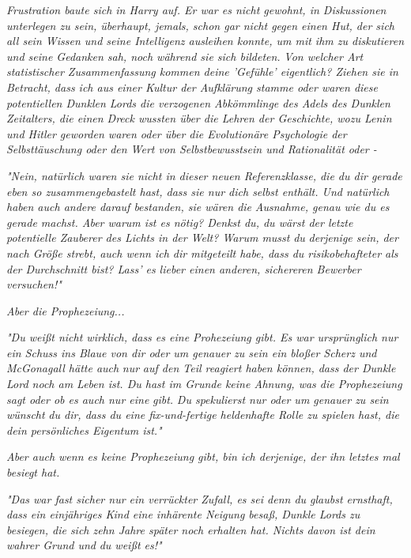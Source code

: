 {\emph{Frustration baute sich in Harry auf. Er war es nicht gewohnt, in Diskussionen unterlegen zu sein, überhaupt, jemals, schon gar nicht gegen einen Hut, der sich all sein Wissen und seine Intelligenz ausleihen konnte, um mit ihm zu diskutieren und seine Gedanken sah, noch während sie sich bildeten.} \emph{\emph{Von welcher Art statistischer Zusammenfassung kommen deine 'Gefühle' eigentlich? Ziehen sie in Betracht, dass ich aus einer Kultur der Aufklärung stamme oder waren diese potentiellen Dunklen Lords die verzogenen Abkömmlinge des Adels des Dunklen Zeitalters, die einen Dreck wussten über die Lehren der Geschichte, wozu Lenin und Hitler geworden waren oder über die Evolutionäre Psychologie der Selbsttäuschung oder den Wert von Selbstbewusstsein und Rationalität oder -}}

\emph{"Nein, natürlich waren sie nicht in dieser neuen Referenzklasse, die du dir gerade eben so zusammengebastelt hast, dass sie nur dich selbst enthält. Und natürlich haben auch andere darauf bestanden, sie wären die} \emph{Ausnahme, genau wie du es gerade machst. Aber warum ist es nötig? Denkst du, du wärst der letzte potentielle Zauberer des Lichts in der Welt? Warum musst} \emph{du} \emph{\emph{derjenige sein, der nach Größe strebt, auch wenn ich dir mitgeteilt habe, dass du risikobehafteter als der Durchschnitt bist? Lass' es lieber einen anderen, sichereren Bewerber versuchen!"}}

\emph{Aber die Prophezeiung...}

\emph{"Du weißt nicht wirklich, dass es eine Prohezeiung gibt. Es war ursprünglich nur ein Schuss ins Blaue von dir oder um genauer zu sein ein bloßer Scherz und McGonagall hätte auch} \emph{nur} \emph{auf den Teil reagiert haben können, dass der Dunkle Lord noch am Leben ist. Du hast im Grunde keine Ahnung, was die Prophezeiung sagt oder ob es auch nur eine} \emph{gibt.} \emph{\emph{Du spekulierst nur oder um genauer zu sein}} \emph{wünscht} \emph{\emph{du dir, dass du eine fix-und-fertige heldenhafte Rolle zu spielen hast, die dein persönliches Eigentum ist."}}

\emph{Aber auch wenn es keine Prophezeiung gibt, bin ich derjenige, der ihn letztes mal besiegt hat.}

\emph{"Das war fast sicher nur ein verrückter Zufall, es sei denn du glaubst ernsthaft, dass ein einjähriges Kind eine inhärente Neigung besaß, Dunkle Lords zu besiegen, die sich zehn Jahre später noch erhalten hat. Nichts davon ist dein wahrer Grund und} \emph{du weißt es!\emph{"}}

}
